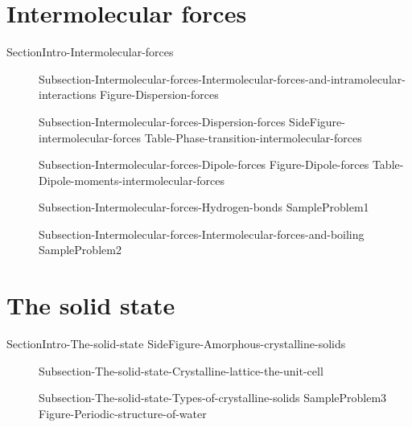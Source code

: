 \documentclass[main.tex]{subfiles}
\newcommand\chapterlabel{Ch-solids}\setcounter{figurenewcounter}{0}\setcounter{tablenewcounter}{0}\setcounter{formulanewcounter}{0}
\begin{document}
\section{Intermolecular forces}{SectionIntro-Intermolecular-forces}
\sloppy \begin{description}
\item[] {Subsection-Intermolecular-forces-Intermolecular-forces-and-intramolecular-interactions}
{Figure-Dispersion-forces}
\item[] {Subsection-Intermolecular-forces-Dispersion-forces}
{SideFigure-intermolecular-forces}
{Table-Phase-transition-intermolecular-forces}
\item[] {Subsection-Intermolecular-forces-Dipole-forces}
{Figure-Dipole-forces}
{Table-Dipole-moments-intermolecular-forces}
\item[] {Subsection-Intermolecular-forces-Hydrogen-bonds}
{SampleProblem1}
\item[] {Subsection-Intermolecular-forces-Intermolecular-forces-and-boiling}
{SampleProblem2}
\end{description}

\section{The solid state}{SectionIntro-The-solid-state}
{SideFigure-Amorphous-crystalline-solids}
\vspace{2cm}{Figure-Chrystalline-solid-unit-cell}
\sloppy \begin{description}
\item[] {Subsection-The-solid-state-Crystalline-lattice-the-unit-cell}
\item[] {Subsection-The-solid-state-Types-of-crystalline-solids}
{SampleProblem3}
{Figure-Periodic-structure-of-water}
\end{description}
\end{document}
